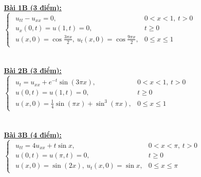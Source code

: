 \documentclass[10.5pt, a4paper]{article}
\begin{document}
\color{red}\underline{\textbf{Bài 1B (3 điểm):}} \color{black}$\begin{cases}
\begin{array}{ll}
u_{tt}-u_{xx}=0, & 0<x<1,~t>0\\
u_x(0,t)=u(1,t)=0, & t\ge0\\
u(x,0)=\cos\frac{3\pi x}{2},~u_t(x,0)=\cos\frac{9\pi x}{2}, & 0\le x\le1
\end{array}
\end{cases}$\\\\\\
\color{red}\underline{\textbf{Bài 2B (3 điểm):}} \color{black}$\begin{cases}
\begin{array}{ll}
u_t=u_{xx}+e^{-t}\sin(3\pi x), & 0<x<1,~t>0\\
u(0,t)=u(1,t)=0, & t\ge0\\
u(x,0)=\frac14\sin(\pi x)+\sin^3(\pi x), & 0\le x\le1
\end{array}
\end{cases}$\\\\\\
\color{red}\underline{\textbf{Bài 3B (4 điểm):}} \color{black}$\begin{cases}
\begin{array}{ll}
u_{tt}=4u_{xx}+t\sin x, & 0<x<\pi,~t>0\\
u(0,t)=u(\pi,t)=0, & t\ge0\\
u(x,0)=\sin(2x),~u_t(x,0)=\sin x, & 0\le x\le\pi
\end{array}
\end{cases}$

\newpage
\end{document}
